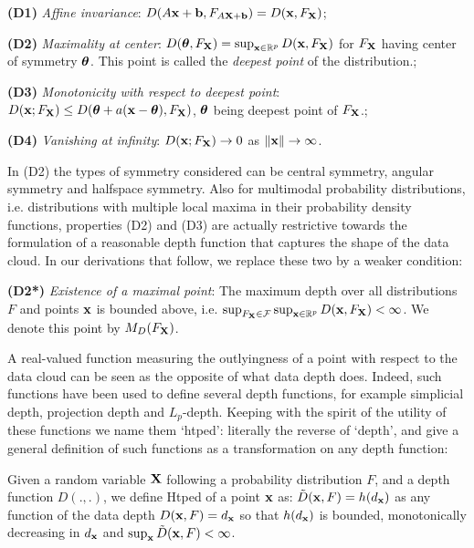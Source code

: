 \documentclass[fleqn,11pt]{article}
\begin{document}
\vspace{1em}
\noindent\textbf{(D1)} \textit{Affine invariance}: $D(A{\bf{x}} + {\bf{b}}, F_{A{\mathbf{X}}+{\bf{b}}}) = D({\bf{x}}, F_{\mathbf{X}})$;

\noindent\textbf{(D2)} \textit{Maximality at center}: $D({\boldsymbol{\theta}}, F_{\mathbf{X}}) = \sup_{{\bf{x}}\in \mathbb{R}^p} D({\bf{x}}, F_{\mathbf{X}})$ for $F_{\mathbf{X}}$ having center of symmetry ${\boldsymbol{\theta}}$. This point is called the \textit{deepest point} of the distribution.;

\noindent\textbf{(D3)} \textit{Monotonicity with respect to deepest point}: $D({\bf{x}}; F_{\mathbf{X}}) \leq D({\boldsymbol{\theta}} + a({\bf{x}} - {\boldsymbol{\theta}}), F_{\mathbf{X}})$, ${\boldsymbol{\theta}}$ being deepest point of $F_{\mathbf{X}}$.;

\noindent\textbf{(D4)} \textit{Vanishing at infinity}: $D({\bf{x}}; F_{\mathbf{X}}) \rightarrow 0$ as $\|{\bf{x}}\| \rightarrow \infty $.
\vspace{1em}

In (D2) the types of symmetry considered can be central symmetry, angular symmetry and halfspace symmetry. Also for multimodal probability distributions, i.e. distributions with multiple local maxima in their probability density functions, properties (D2) and (D3) are actually restrictive towards the formulation of a reasonable depth function that captures the shape of the data cloud. In our derivations that follow, we replace these two by a weaker condition:

\vspace{1em}
\noindent\textbf{(D2*)} \textit{Existence of a maximal point}: The maximum depth over all distributions $F$ and points ${\bf{x}}$ is bounded above, i.e. $ \sup_{F_{\mathbf{X}} \in \mathcal F} \sup_{{\bf{x}}\in \mathbb{R}^p} D({\bf{x}}, F_{\mathbf{X}}) < \infty $. We denote this point by $M_D(F_{\mathbf{X}})$.
\vspace{1em}

A real-valued function measuring the outlyingness of a point with respect to the data cloud can be seen as the opposite of what data depth does. Indeed, such functions have been used to define several depth functions, for example simplicial depth, projection depth and $L_p$-depth. Keeping with the spirit of the utility of these functions we name them `htped': literally the reverse of `depth', and give a general definition of such functions as a transformation on any depth function:

\begin{Definition}
Given a random variable ${\mathbf{X}}$ following a probability distribution $F$, and a depth function $D(.,.)$, we define Htped of a point ${\bf{x}}$ as: $\tilde D({\bf{x}}, F) = h(d_{\bf{x}})$ as any function of the data depth $D({\bf{x}}, F) = d_{\bf{x}}$ so that $h(d_{\bf{x}})$ is bounded, monotonically decreasing in $d_{\bf{x}}$ and $\sup_{\bf{x}} \tilde D({\bf{x}}, F) < \infty$.
\end{Definition}
\end{document}
